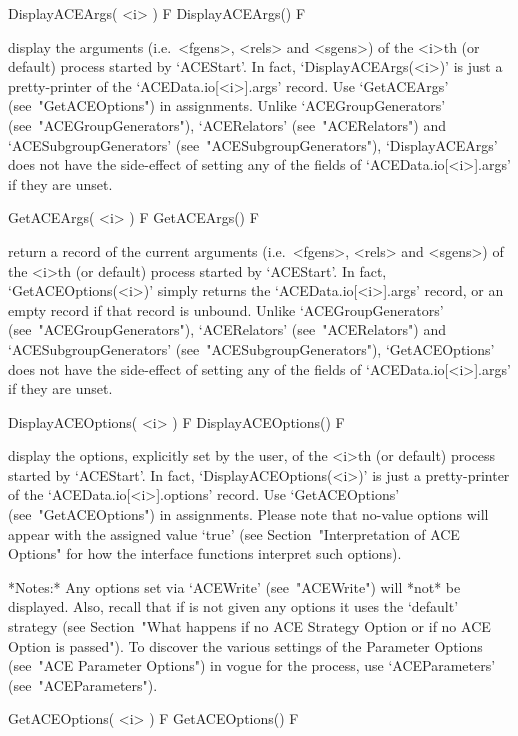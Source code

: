 \>DisplayACEArgs( <i> ) F
\>DisplayACEArgs() F

display the arguments (i.e.~<fgens>, <rels> and <sgens>) of the  <i>th
(or   default)   process   started    by    `ACEStart'.    In    fact,
`DisplayACEArgs(<i>)'   is    just    a    pretty-printer    of    the
`ACEData.io[<i>].args' record. Use `GetACEArgs'  (see~"GetACEOptions")
in          assignments.          Unlike          `ACEGroupGenerators'
(see~"ACEGroupGenerators"),  `ACERelators'   (see~"ACERelators")   and
`ACESubgroupGenerators'                 (see~"ACESubgroupGenerators"),
`DisplayACEArgs' does not have the side-effect of setting any  of  the
fields of `ACEData.io[<i>].args' if they are unset.

\>GetACEArgs( <i> ) F
\>GetACEArgs() F

return a record of the current  arguments  (i.e.~<fgens>,  <rels>  and
<sgens>) of the <i>th (or default) process started by  `ACEStart'.  In
fact, `GetACEOptions(<i>)' simply returns  the  `ACEData.io[<i>].args'
record,  or  an  empty  record  if  that  record  is  unbound.  Unlike
`ACEGroupGenerators'     (see~"ACEGroupGenerators"),     `ACERelators'
(see~"ACERelators")            and             `ACESubgroupGenerators'
(see~"ACESubgroupGenerators"),  `GetACEOptions'  does  not  have   the
side-effect of setting any of the fields of `ACEData.io[<i>].args'  if
they are unset.

\>DisplayACEOptions( <i> ) F
\>DisplayACEOptions() F

display the options, explicitly set by the user, of the  <i>th  (or  default)  process  started  by
`ACEStart'. In fact, `DisplayACEOptions(<i>)' is just a pretty-printer
of   the   `ACEData.io[<i>].options'   record.   Use   `GetACEOptions'
(see~"GetACEOptions") in assignments. Please note that no-value {\ACE}
options  will   appear   with   the   assigned   value   `true'   (see
Section~"Interpretation of ACE Options" for how the  {\ACE}  interface
functions interpret such options). 

*Notes:* 
Any  options  set  via  `ACEWrite'  (see~"ACEWrite")  will  *not*   be
displayed. Also, recall that if {\ACE} is not  given  any  options  it
uses the `default' strategy  (see  Section~"What  happens  if  no  ACE
Strategy Option or if no ACE  Option  is  passed").  To  discover  the
various settings of the {\ACE} Parameter Options  (see~"ACE  Parameter
Options")  in  vogue  for  the  {\ACE}  process,  use  `ACEParameters'
(see~"ACEParameters").

\>GetACEOptions( <i> ) F
\>GetACEOptions() F

